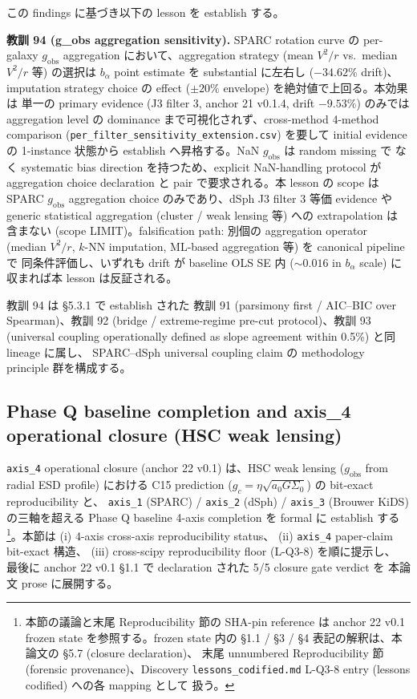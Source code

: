 \documentclass[11pt,a4paper]{ltjsarticle}
\begin{document}
この findings に基づき以下の lesson を establish する。

\smallskip
\noindent
\textbf{教訓 94 (g\_obs aggregation sensitivity).}\quad
SPARC rotation curve の per-galaxy $g_{\text{obs}}$ aggregation において、aggregation
strategy (mean $V^2/r$ vs.\ median $V^2/r$ 等) の選択は $b_\alpha$ point estimate を
substantial に左右し ($-34.62\%$ drift)、imputation strategy choice の effect
($\pm 20\%$ envelope) を絶対値で上回る。本効果は 単一の primary evidence
(J3 filter 3, anchor 21 v0.1.4, drift $-9.53\%$) のみでは aggregation level の
dominance まで可視化されず、cross-method 4-method comparison
(\texttt{per\_filter\_sensitivity\_extension.csv}) を要して initial evidence の
1-instance 状態から establish へ昇格する。NaN $g_{\text{obs}}$ は random missing で
なく systematic bias direction を持つため、explicit NaN-handling protocol が
aggregation choice declaration と pair で要求される。本 lesson の scope は SPARC
$g_{\text{obs}}$ aggregation choice のみであり、dSph J3 filter 3 等価 evidence や
generic statistical aggregation (cluster / weak lensing 等) への extrapolation は
含まない (scope LIMIT)。falsification path: 別個の aggregation operator
(median $V^2/r$, $k$-NN imputation, ML-based aggregation 等) を canonical pipeline で
同条件評価し、いずれも drift が baseline OLS SE 内 ($\sim 0.016$ in $b_\alpha$ scale)
に収まれば本 lesson は反証される。

\smallskip
\noindent
教訓 94 は \S 5.3.1 で establish された 教訓 91 (parsimony first / AIC--BIC over
Spearman)、教訓 92 (bridge / extreme-regime pre-cut protocol)、教訓 93 (universal
coupling operationally defined as slope agreement within 0.5\%) と同 lineage に属し、
SPARC--dSph universal coupling claim の methodology principle 群を構成する。


\subsection{Phase Q baseline completion and axis\_4 operational closure (HSC weak lensing)}
\label{sec:axis4-operational-closure}

\texttt{axis\_4} operational closure (anchor 22 v0.1) は、HSC weak lensing
($g_{\text{obs}}$ from radial ESD profile) における C15 prediction
($g_c = \eta\sqrt{a_0 G \Sigma_0}$) の bit-exact reproducibility と、
\texttt{axis\_1} (SPARC) / \texttt{axis\_2} (dSph) / \texttt{axis\_3}
(Brouwer KiDS) の三軸を超える Phase Q baseline 4-axis completion を
formal に establish する\footnote{本節の議論と末尾 Reproducibility 節の SHA-pin
reference は anchor 22 v0.1 frozen state を参照する。frozen state 内の
\S 1.1 / \S 3 / \S 4 表記の解釈は、本論文の \S 5.7 (closure declaration)、
末尾 unnumbered Reproducibility 節 (forensic provenance)、Discovery
\texttt{lessons\_codified.md} L-Q3-8 entry (lessons codified) への各 mapping として
扱う。}。本節は (i) 4-axis cross-axis reproducibility status、
(ii) \texttt{axis\_4} paper-claim bit-exact 構造、
(iii) cross-scipy reproducibility floor (L-Q3-8) を順に提示し、
最後に anchor 22 v0.1 \S 1.1 で declaration された 5/5 closure gate verdict を
本論文 prose に展開する。
\end{document}
